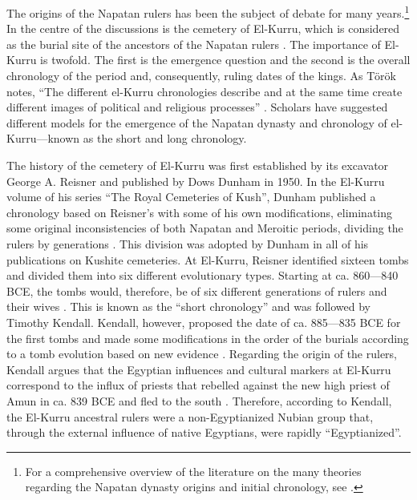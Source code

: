 The origins of the Napatan rulers has been the subject of debate for many years.\footnote{For a comprehensive overview of the literature on the many theories regarding the Napatan dynasty origins and initial chronology, see \cite{morkotPriestlyOriginNapatan2003}.} In the centre of the discussions is the cemetery of El-Kurru, which is considered as the burial site of the ancestors of the Napatan rulers \parencite{torokKingdomKushHandbook1997, torokTwoWorldsFrontier2009, morkotKingshipKinshipEmpire1999}. The importance of El-Kurru is twofold. The first is the emergence question and the second is the overall chronology of the period and, consequently, ruling dates of the kings. As Török notes, “The different el-Kurru chronologies describe and at the same time create different images of political and religious processes” \parencite[p.~304]{torokTwoWorldsFrontier2009}. Scholars have suggested different models for the emergence of the Napatan dynasty and chronology of el-Kurru—known as the short and long chronology.

The history of the cemetery of El-Kurru was first established by its excavator George A. Reisner and published by Dows Dunham in 1950. In the El-Kurru volume of his series “The Royal Cemeteries of Kush”, Dunham published a chronology based on Reisner’s with some of his own modifications, eliminating some original inconsistencies of both Napatan and Meroitic periods, dividing the rulers by generations \parencite[p.~2]{dunhamElKurru1950}. This division was adopted by Dunham in all of his publications on Kushite cemeteries. At El-Kurru, Reisner identified sixteen tombs and divided them into six different evolutionary types. Starting at ca. 860—840 BCE, the tombs would, therefore, be of six different generations of rulers and their wives \cite{reisnerDiscoveryTombsEgyptian1919, reisnerNoteHarvardBostonExcavations1920}. This is known as the “short chronology” and was followed by Timothy Kendall. Kendall, however, proposed the date of ca. 885—835 BCE for the first tombs and made some modifications in the order of the burials according to a tomb evolution based on new evidence \parencite[p.~4]{kendallOriginNapatanState1999}. Regarding the origin of the rulers, Kendall argues that the Egyptian influences and cultural markers at El-Kurru correspond to the influx of priests that rebelled against the new high priest of Amun in ca. 839 BCE and fled to the south \parencite[p.~5,57]{kendallOriginNapatanState1999}. Therefore, according to Kendall, the El-Kurru ancestral rulers were a non-Egyptianized Nubian group that, through the external influence of native Egyptians, were rapidly “Egyptianized”.


